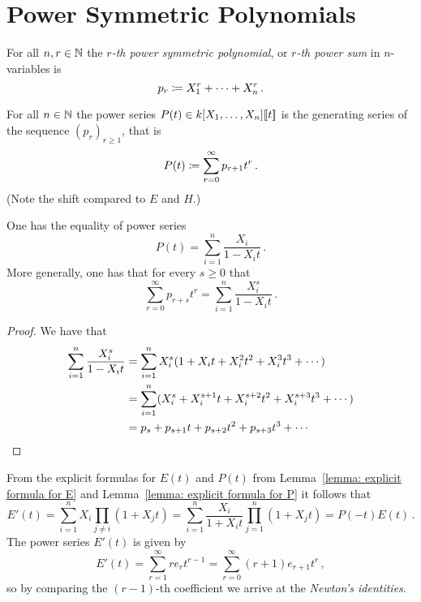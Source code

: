 \section{Power Symmetric Polynomials}


\begin{definition}
  For all $n, r \in \mathbb{N}$ the \emph{$r$-th power symmetric polynomial}, or \emph{$r$-th power sum} in $n$-variables is
  \[
              p_r
    \coloneqq  X_1^r + \dotsb + X_n^r \,.
  \]
\end{definition}


\begin{definition}
  For all $n \in \mathbb{N}$ the power series $P(t) \in k[X_1, \dotsc, X_n]\!\left[\!\left[t\right]\!\right]$ is the generating series of the sequence $(p_r)_{r \geq 1}$, that is
  \[
            P(t)
  \coloneqq  \sum_{r=0}^\infty p_{r+1} t^r \,.
  \]
  (Note the shift compared to $E$ and $H$.)
\end{definition}


\begin{lemma}
  \label{lemma: explicit formula for P}
  One has the equality of power series
  \[
      P(t)
    = \sum_{i=1}^n \frac{X_i}{1 - X_i t} \,.
  \]
  More generally, one has that for every $s \geq 0$ that
  \[
      \sum_{r=0}^\infty p_{r+s} t^r
    = \sum_{i=1}^n \frac{X_i^s}{1 - X_i t} \,.
  \]
\end{lemma}


\begin{proof}
  We have that
  \begin{align*}
        \sum_{i=1}^n \frac{X_i^s}{1-X_i t}
    &=  \sum_{i=1}^n X_i^s (1 + X_i t + X_i^2 t^2 + X_i^3 t^3 + \dotsb) \\
    &=  \sum_{i=1}^n (X_i^s + X_i^{s+1} t + X_i^{s+2} t^2 + X_i^{s+3} t^3 + \dotsb) \\
    &=  p_s + p_{s+1} t + p_{s+2} t^2 + p_{s+3} t^3 + \dotsb
    \qedhere
  \end{align*}
\end{proof}


\begin{fluff}
  \label{fluff: connection between E and P}
  From the explicit formulas for $E(t)$ and $P(t)$ from Lemma~\ref{lemma: explicit formula for E} and Lemma~\ref{lemma: explicit formula for P} it follows that
  \[
      E'(t)
    = \sum_{i=1}^n X_i \prod_{j \neq i} (1 + X_j t)
    = \sum_{i=1}^n \frac{X_i}{1 + X_i t} \prod_{j=1}^n (1 + X_j t)
    = P(-t)E(t) \,.
  \]
  The power series $E'(t)$ is given by
  \[
      E'(t)
    = \sum_{r=1}^\infty r e_r t^{r-1}
    = \sum_{r=0}^\infty (r+1) e_{r+1} t^r \,,
  \]
  so by comparing the $(r-1)$-th coefficient we arrive at the \emph{Newton’s identities}.
\end{fluff}


